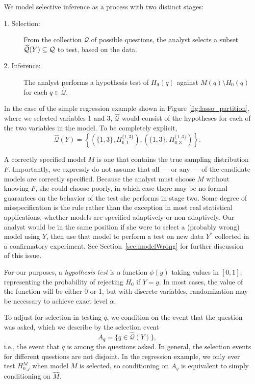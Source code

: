 \documentclass{article}
\theoremstyle{definition}
\newcommand{\cQ}{\mathcal{Q}}
\newcommand{\hcQ}{\widehat{\mathcal{Q}}}
\newcommand{\hM}{\widehat{M}}
\begin{document}
We model selective inference as a process with two distinct stages:
\begin{description}
\item[1. Selection:] From the collection $\cQ$ of possible questions, the analyst selects a subset $\hcQ(Y)\sub \cQ$ to test, based on the data.
\item[2. Inference:] The analyst performs a hypothesis test of $H_0(q)$ against $M(q)\setminus H_0(q)$ for each $q \in \hcQ$.
\end{description}

In the case of the simple regression example shown in Figure \ref{fig:lasso_partition}, where we selected variables 1 and 3, $\hcQ$ would consist of the hypotheses for each of the two variables in the model. To be completely explicit,
\[ \hcQ(Y) = \left\{ \left(\{1, 3\}, H^{\{1, 3\}}_{0, 1}\right), \left(\{1, 3\}, H^{\{1, 3\}}_{0, 3}\right) \right\}. \]

A correctly specified model $M$ is one that contains the true sampling distribution $F$. Importantly, we expressly do not assume that all --- or any --- of the candidate models are correctly specified. Because the analyst must choose $M$ without knowing $F$, she could choose poorly, in which case there may be no formal guarantees on the behavior of the test she performs in stage two. Some degree of misspecification is the rule rather than the exception in most real statistical applications, whether models are specified adaptively or non-adaptively. Our analyst would be in the same position if she were to select a (probably wrong) model using $Y$, then use that model to perform a test on new data $Y^*$ collected in a confirmatory experiment. See Section~\ref{sec:modelWrong} for further discussion of this issue.

For our purposes, a {\em hypothesis test} is a function $\phi(y)$ taking values in $[0, 1]$, representing the probability of rejecting $H_0$ if $Y=y$. In most cases, the value of the function will be either 0 or 1, but with discrete variables, randomization may be necessary to achieve exact level $\alpha$.

To adjust for selection in testing $q$, we condition on the event that the question was asked, which we describe by the selection event
\begin{equation}
A_q = \{q \in \hcQ(Y) \},
\label{eq:A_q}
\end{equation}
i.e., the event that $q$ is among the questions asked. In general, the selection events for different questions are not disjoint. In the regression example, we only ever test $H^M_{0, j}$ when model $M$ is selected, so conditioning on $A_q$ is equivalent to simply conditioning on $\hM$.
\end{document}
